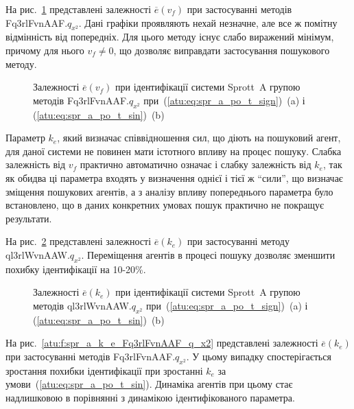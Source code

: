 На рис.~\ref{atu:f:spr_a_v_f_Fq3rlFvnAAF_q_x2} представлені залежності
$\overline{e}(v_f)$ при застосуванні методів Fq3rlFvnAAF.$q_{x^2}$. Дані графіки проявляють нехай незначне, але все ж
помітну відмінність від попередніх. Для цього методу існує
слабо виражений мінімум, причому для нього
$v_f \ne 0$, що дозволяє виправдати застосування пошукового методу.

\begin{figure}[htb!]
  \caption{Залежності $\overline{e}(v_f)$ при ідентифікації системи Sprott~A групою методів Fq3rlFvnAAF.$q_{x^2}$ при~(\ref{atu:eq:spr_a_po_t_sign})~(a) і (\ref{atu:eq:spr_a_po_t_sin})~(b)}
  \label{atu:f:spr_a_v_f_Fq3rlFvnAAF_q_x2}
\end{figure}

Параметр
$k_e$, який визначає співвідношення сил, що діють на пошуковий
агент, для даної системи не повинен мати істотного впливу на
процес пошуку. Слабка залежність від
$v_f$ практично автоматично означає і слабку залежність від
$k_e$, так як обидва ці параметра входять у визначення однієї
і тієї ж ``сили'', що визначає зміщення пошукових агентів, а з
аналізу впливу попереднього параметра було встановлено, що в
даних конкретних умовах пошук практично не покращує результати.


На рис.~\ref{atu:f:spr_a_k_e_ql3rlWvnAAW_q_x2} представлені залежності
$\overline{e} (k_e)$ при застосуванні методу ql3rlWvnAAW.$q_{x^2}$. Переміщення агентів в процесі пошуку дозволяє зменшити
похибку ідентифікації на 10-20\%.

\begin{figure}[htb!]
  \caption{Залежності $\overline{e} (k_e)$ при ідентифікації системи Sprott~A групою методів ql3rlWvnAAW.$q_{x^2}$ при~(\ref{atu:eq:spr_a_po_t_sign})~(a) і (\ref{atu:eq:spr_a_po_t_sin})~(b)}
  \label{atu:f:spr_a_k_e_ql3rlWvnAAW_q_x2}
\end{figure}

На рис.~\ref{atu:f:spr_a_k_e_Fq3rlFvnAAF_q_x2} представлені залежності
$\overline{e} (k_e)$ при застосуванні методів
Fq3rlFvnAAF.$q_{x^2}$.
У цьому випадку спостерігається зростання похибки
ідентифікації при зростанні
$k_e$ за умови~(\ref{atu:eq:spr_a_po_t_sin}). Динаміка агентів при цьому
стає надлишковою в порівнянні з динамікою ідентифікованого
параметра.

